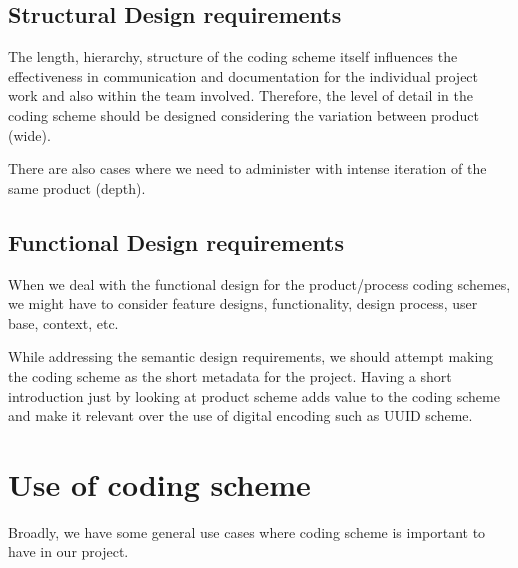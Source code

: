 \subsection{Structural Design requirements}

The length, hierarchy, structure of the coding scheme itself influences the  effectiveness in communication and documentation for the individual project work and also within the team involved. Therefore, the level of detail in the coding scheme should be designed considering the variation between product (wide).

There are also cases where we need to administer with intense iteration of the same product (depth).

\subsection{Functional Design requirements}

When we deal with the functional design for the product/process coding schemes, we might have to consider feature designs, functionality, design process, user base, context, etc. \cite{Kohoeo2023Thesis}

While addressing the semantic design requirements, we should attempt making the coding scheme as the short metadata for the project. Having a short introduction just by looking at product scheme adds value to the coding scheme and make it relevant over the use of digital encoding such as UUID scheme.

\section{Use of coding scheme}

Broadly, we have some general use cases where coding scheme is important to have in our project.


